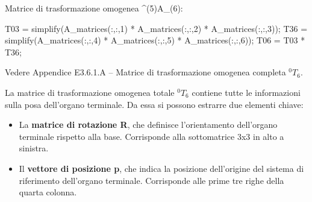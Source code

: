 \documentclass[11pt, a4paper]{article}
\begin{document}
\begin{matlaboutput}
Matrice di trasformazione omogenea ^(5)A_(6):
\end{matlaboutput}
\begin{matlabcode}

T03 = simplify(A_matrices(:,:,1) * A_matrices(:,:,2) * A_matrices(:,:,3));
T36 = simplify(A_matrices(:,:,4) * A_matrices(:,:,5) * A_matrices(:,:,6));
T06 = T03 * T36;
\end{matlabcode}
\begin{par}
\begin{flushleft}
Vedere Appendice E3.6.1.A -- Matrice di trasformazione omogenea completa ${}^{0}T_{6}$.
\end{flushleft}
\end{par}
\begin{par}
\begin{flushleft}
La matrice di trasformazione omogenea totale $^0 T_6$ contiene tutte le informazioni sulla posa dell'organo terminale. Da essa si possono estrarre due elementi chiave:
\end{flushleft}
\end{par}

\begin{itemize}
\setlength{\itemsep}{-1ex}
   \item{\begin{flushleft} La \textbf{matrice di rotazione R}, che definisce l'orientamento dell'organo terminale rispetto alla base. Corrisponde alla sottomatrice 3x3 in alto a sinistra. \end{flushleft}}
   \item{\begin{flushleft} Il \textbf{vettore di posizione p}, che indica la posizione dell'origine del sistema di riferimento dell'organo terminale. Corrisponde alle prime tre righe della quarta colonna. \end{flushleft}}
\end{itemize}
\end{document}
